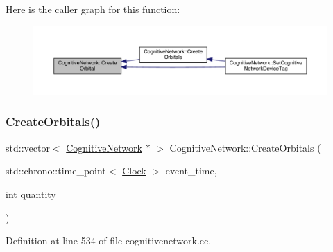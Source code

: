 Here is the caller graph for this function\+:
\nopagebreak
\begin{figure}[H]
\begin{center}
\leavevmode
\includegraphics[width=350pt]{class_cognitive_network_a5e0a782afc45d75d57fef91dd5513546_icgraph}
\end{center}
\end{figure}
\mbox{\label{class_cognitive_network_a46d4189cf3e6b9af6190abe7b79539b4}} 
\subsubsection{\texorpdfstring{Create\+Orbitals()}{CreateOrbitals()}}
{\footnotesize\ttfamily std\+::vector$<$ \hyperlink{class_cognitive_network}{Cognitive\+Network} $\ast$ $>$ Cognitive\+Network\+::\+Create\+Orbitals (\begin{DoxyParamCaption}\item[{std\+::chrono\+::time\+\_\+point$<$ \hyperlink{universe_8h_a0ef8d951d1ca5ab3cfaf7ab4c7a6fd80}{Clock} $>$}]{event\+\_\+time,  }\item[{int}]{quantity }\end{DoxyParamCaption})}



Definition at line 534 of file cognitivenetwork.\+cc.

